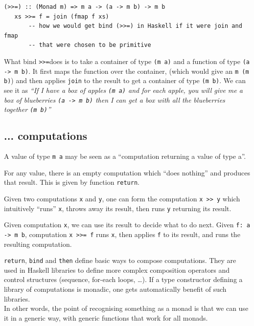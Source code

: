 \begin{lstlisting}[caption={Bind operator in Haskell.}]
   (>>=) :: (Monad m) => m a -> (a -> m b) -> m b
   xs >>= f = join (fmap f xs) 
       -- how we would get bind (>>=) in Haskell if it were join and fmap
       -- that were chosen to be primitive
\end{lstlisting}
What bind \lstinline|>>=|does is to take a container of type \lstinline|(m a)| and a function of type \lstinline|(a -> m b)|. It first maps the function over the container, (which would give an \lstinline|m (m b)|) and then applies \lstinline|join| to the result to get a container of type \lstinline|(m b)|. 
We can see it as \textit{``If I have a box of apples \lstinline|(m a)| and for each apple, you will give me a box of blueberries \lstinline|(a -> m b)| then I can get a box with all the blueberries together \lstinline|(m b)|''}

\subsection{... computations}

A value of type \lstinline|m a| may be seen as a ``computation returning a value of type a''.

For any value, there is an empty computation which ``does nothing'' and
produces that result. This is given by function \lstinline|return|.

Given two computations \lstinline|x| and \lstinline|y|, one can form the computation
\lstinline|x >> y| which intuitively ``runs'' \lstinline|x|, throws away its result, then runs \lstinline|y| returning its result.

Given computation \lstinline|x|, we can use its result to decide what to do next.
Given \lstinline|f: a -> m b|, computation \lstinline|x >>= f| runs \lstinline|x|, then applies
\lstinline|f| to its result, and runs the resulting computation.


\lstinline|return|, \lstinline|bind| and \lstinline|then| define basic ways to compose computations.
They are used in Haskell libraries to define more complex composition
operators and control structures (sequence, for-each loops, \dots).
If a type constructor defining a library of computations is monadic, one
gets automatically benefit of such libraries.\\
In other words, the point of recognising something as a monad is that we can use it in a generic way, with generic functions that work for all monads.

